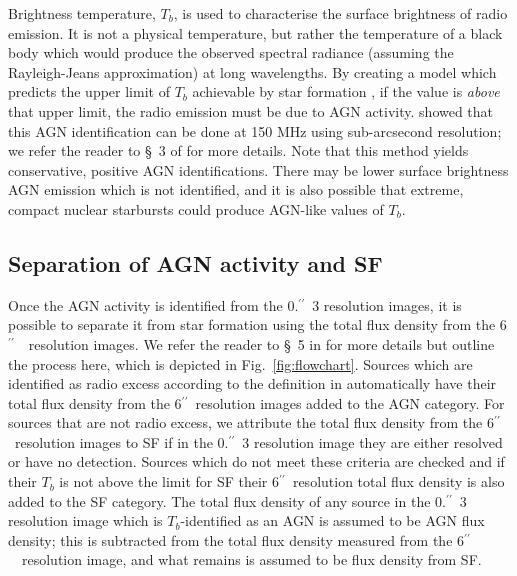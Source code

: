 \documentclass[usenatbib,fleqn,letters]{mnras}
\newcommand{\sarc}{$^{\prime\prime}\!\!$}
\begin{document}
Brightness temperature, $T_b$, is used to characterise the surface brightness of radio emission. It is not a physical temperature, but rather the temperature of a black body  which would produce the observed spectral radiance (assuming the Rayleigh-Jeans approximation) at long wavelengths. By creating a model which predicts the upper limit of $T_b$ achievable by star formation \citep[based on][]{condon_radio_1992}, if the value is \textit{above} that upper limit, the radio emission must be due to AGN activity.   showed that this AGN identification can be done at 150 MHz using sub-arcsecond resolution; 
we refer the reader to \S~3 of  for more details. Note that this method yields conservative, positive AGN identifications. There may be lower surface brightness AGN emission which is not identified, and it is also possible \citep[although unlikely, according to][]{condon_radio_1992} that extreme, compact nuclear starbursts could produce AGN-like values of $T_b$. 

\subsection{Separation of AGN activity and SF}
Once the AGN activity is identified from the 0.\sarc\ 3 resolution images, it is possible to separate it from star formation using the total flux density from the 6\sarc\ \ resolution images. We refer the reader to \S~5 in  for more details but outline the process here, which is depicted in Fig.~\ref{fig:flowchart}. Sources which are identified as radio excess according to the definition in  automatically have their total flux density from the 6\sarc\ resolution images added to the AGN category. For sources that are not radio excess, we attribute the total flux density from the 6\sarc\ resolution images to SF if in the 0.\sarc\ 3 resolution image they are either resolved or have no detection. Sources which do not meet these criteria are checked and if their $T_b$ is not above the limit for SF their 6\sarc\ resolution total flux density is also added to the SF category. The total flux density of any source in the 0.\sarc\ 3 resolution image which is $T_b$-identified as an AGN is assumed to be AGN flux density; this is subtracted from the total flux density measured from the 6\sarc\ \ resolution image, and what remains is assumed to be flux density from SF. 
\end{document}
